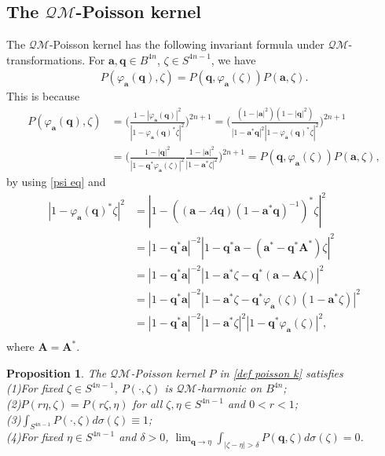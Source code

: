 \documentclass[a4paper,11pt]{amsart}
\numberwithin{equation}{section}
\newtheorem{prop}{Proposition}[section]
\begin{document}
\subsection{The $\mathcal{QM}$-Poisson kernel}
The $\mathcal{QM}$-Poisson kernel has the following invariant formula under $\mathcal{QM}$-transformations. For $\mathbf{a},\mathbf{q}\in B^{4n}$, $\zeta\in S^{4n-1}$, we have
\begin{equation}\begin{aligned}\label{P}
P(\varphi_{\mathbf{a}}(\mathbf{q}),\zeta)=P(\mathbf{q},\varphi_{\mathbf{a}}(\zeta))P(\mathbf{a},\zeta).
\end{aligned}\end{equation}
This is because
\begin{equation*}\begin{aligned}
P(\varphi_{\mathbf{a}}(\mathbf{q}),\zeta)&=\bigg(\frac{1-|\varphi_{\mathbf{a}}(\mathbf{q})|^2}{|1-\varphi_{\mathbf{a}}(\mathbf{q})^*\zeta|^2}\bigg)^{2n+1}=\bigg(\frac{(1-|\mathbf{a}|^2)(1-|\mathbf{q}|^2)}{|1-\mathbf{a}^*\mathbf{q}|^2|1-\varphi_{\mathbf{a}}(\mathbf{q})^*\zeta|^2}\bigg)^{2n+1}\\
&=\bigg(\frac{1-|\mathbf{q}|^2}{|1-\mathbf{q}^*\varphi_{\mathbf{a}}(\zeta)|^2}\frac{1-|\mathbf{a}|^2}{|1-\mathbf{a}^*\zeta|^2}\bigg)^{2n+1}=P(\mathbf{q},\varphi_{\mathbf{a}}(\zeta))P(\mathbf{a},\zeta),
\end{aligned}\end{equation*}
by using \eqref{psi eq} and
\begin{equation*}\begin{aligned}
|1-\varphi_{\mathbf{a}}(\mathbf{q})^*\zeta|^2&=\left|1-\left((\mathbf{a}-A\mathbf{q})(1-\mathbf{a}^*\mathbf{q})^{-1}\right)^{*}\zeta\right|^2\\
&=|1-\mathbf{q}^*\mathbf{a}|^{-2}|1-\mathbf{q}^*\mathbf{a}-(\mathbf{a}^*-\mathbf{q}^*\mathbf{A}^*)\zeta|^2\\
&=|1-\mathbf{q}^*\mathbf{a}|^{-2}|1-\mathbf{a}^*\zeta-\mathbf{q}^*(\mathbf{a}-\mathbf{A}\zeta)|^2\\
&=|1-\mathbf{q}^*\mathbf{a}|^{-2}|1-\mathbf{a}^*\zeta-\mathbf{q}^*\varphi_{\mathbf{a}}(\zeta)(1-\mathbf{a}^*\zeta)|^2\\
&=|1-\mathbf{q}^*\mathbf{a}|^{-2}|1-\mathbf{a}^*\zeta|^2|1-\mathbf{q}^*\varphi_{\mathbf{a}}(\zeta)|^2,\\
\end{aligned}\end{equation*}
where $\mathbf{A}=\mathbf{A}^*$.
\begin{prop}\label{lem pf}
The $\mathcal{QM}$-Poisson kernel $P$ in \eqref{def poisson k} satisfies \\
(1)\;For fixed $\zeta\in S^{4n-1}$, $ P(\cdot,\zeta)$ is $\mathcal{QM}$-harmonic on $B^{4n}$;\\
(2)\;$P(r\eta,\zeta)=P(r\zeta,\eta)$ for all $\zeta,\eta\in S^{4n-1}$ and $0<r<1$;\\
(3)\;$\int_{S^{4n-1}}P(\cdot,\zeta)d\sigma(\zeta)\equiv1$;\\
(4)\;For fixed $\eta\in S^{4n-1}$ and $\delta>0$, $\lim_{\mathbf{q}\rightarrow\eta}\int_{|\zeta-\eta|>\delta}P(\mathbf{q},\zeta)d\sigma(\zeta)=0$.
\end{prop}
\end{document}
